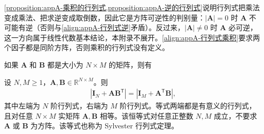 \documentclass[../main.tex]{subfiles}
\begin{document}
\begin{remark}
\cref{proposition:appA-乘积的行列式,proposition:appA-逆的行列式}说明行列式把乘法变成乘法、把求逆变成取倒数，因此它是方阵可逆性的判别量：$|\bm{A}|=0$ 时 $\bm{A}$ 不可能有逆（否则与\eqref{align:appA-行列式逆}矛盾）。反过来，$|\bm{A}|\neq0$ 时 $\bm{A}$ 必可逆，这一方向属于线性代数基本结论，本附录不展开。\eqref{align:appA-行列式乘积}要求两个因子都是同阶方阵，否则乘积的行列式没有定义。
\end{remark}

如果 $\bm{A}$ 和 $\bm{B}$ 都是大小为 $N\times M$ 的矩阵，则有
\begin{proposition}\label{proposition:appA-sylvester}
设 $N,M\geqslant1$，$\bm{A},\bm{B}\in\mathbb{R}^{N\times M}$。则
\begin{align}
  |\bm{I}_N+\bm{A}\bm{B}^{\mathsf{T}}|=|\bm{I}_M+\bm{A}^{\mathsf{T}}\bm{B}|,
  \label{align:appA-sylvester行列式}
\end{align}
其中左端为 $N$ 阶行列式，右端为 $M$ 阶行列式。等式两端都是有意义的行列式，且对任意 $N\times M$ 实矩阵 $\bm{A},\bm{B}$ 相等。该恒等式对任意正整数 $N,M$ 成立，不要求 $\bm{A}$ 或 $\bm{B}$ 为方阵。该等式也称为 Sylvester 行列式定理。
\end{proposition}
\end{document}

